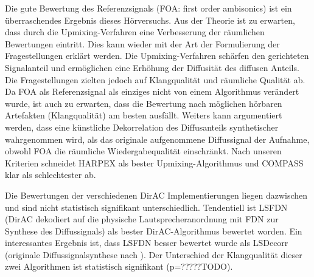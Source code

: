 Die gute Bewertung des Referenzsignals (FOA: first order ambisonics) ist ein überraschendes Ergebnis dieses Hörversuchs. Aus der Theorie ist zu erwarten, dass durch die Upmixing-Verfahren eine Verbesserung der räumlichen Bewertungen eintritt.
Dies kann wieder mit der Art der Formulierung der Fragestellungen erklärt werden.
Die Upmixing-Verfahren schärfen den gerichteten Signalanteil und ermöglichen eine Erhöhung der Diffusität des diffusen Anteils.
Die Fragestellungen zielten jedoch auf Klangqualität und räumliche Qualität ab.
Da FOA als Referenzsignal als einziges nicht von einem Algorithmus verändert wurde, ist auch zu erwarten, dass die Bewertung nach möglichen hörbaren Artefakten (Klangqualität) am besten ausfällt.
Weiters kann argumentiert werden, dass eine künstliche Dekorrelation des Diffusanteils synthetischer wahrgenommen wird, als das originale aufgenommene Diffussignal der Aufnahme, obwohl FOA die räumliche Wiedergabequalität einschränkt.
Nach unseren Kriterien schneidet HARPEX als bester Upmixing-Algorithmus und COMPASS klar als schlechtester ab.

Die Bewertungen der verschiedenen DirAC Implementierungen liegen dazwischen und sind nicht statistisch signifikant unterschiedlich.
Tendentiell ist LSFDN (DirAC dekodiert auf die physische Lautsprecheranordnung mit FDN zur Synthese des Diffussignals) als bester DirAC-Algorithmus bewertet worden.
Ein interessantes Ergebnis ist, dass LSFDN besser bewertet wurde als LSDecorr (originale Diffussignalsynthese nach \cite{pulkki}).
Der Unterschied der Klangqualität dieser zwei Algorithmen ist statistisch signifikant (p=?????TODO).
